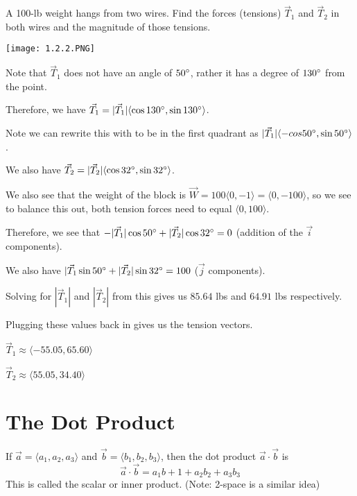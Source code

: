 \documentclass[../calc3.tex]{subfiles}
\begin{document}
\pagebreak
\begin{example}
    A 100-lb weight hangs from two wires. Find the forces (tensions) $\vec{T}_1$ and $\vec{T}_2$ in both wires and the magnitude of those tensions.
    \begin{center}
        \texttt{[image: 1.2.2.PNG]}
    \end{center}

    Note that $\vec{T}_1$ does not have an angle of $50\degree$, rather it has a degree of $130\degree$ from the point.

    Therefore, we have $\vec{T}_1=|\vec{T}_1|\langle \cos 130\degree, \sin 130\degree\rangle$.

    Note we can rewrite this with to be in the first quadrant as $|\vec{T}_1|\langle -cos 50\degree, \sin 50\degree\rangle$.

    We also have $\vec{T}_2=|\vec{T}_2|\langle \cos 32\degree, \sin 32\degree\rangle$.

    We also see that the weight of the block is $\vec{W}=100\langle 0,-1\rangle = \langle 0,-100\rangle$, so we see to balance this out, both tension forces need to equal $\langle 0,100\rangle$.

    Therefore, we see that $-|\vec{T}_1|\cos 50\degree + |\vec{T}_2|\cos 32\degree = 0$ (addition of the $\vec{i}$ components).

    We also have $|\vec{T}_1\sin 50\degree + |\vec{T}_2|\sin 32\degree = 100$ ($\vec{j}$ components).

    Solving for $|\vec{T}_1|$ and $|\vec{T}_2|$ from this gives us $85.64$ lbs and $64.91$ lbs respectively.

    Plugging these values back in gives us the tension vectors. 

    $\vec{T}_1 \approx \langle -55.05, 65.60\rangle$

    $\vec{T}_2 \approx \langle 55.05, 34.40 \rangle$
\end{example}

\section{The Dot Product}
\begin{definition}
    If $\vec{a}=\langle a_1,a_2,a_3\rangle$ and $\vec{b}=\langle b_1,b_2,b_3\rangle$, then the dot product $\vec{a}\cdot \vec{b}$ is 
    \[ \vec{a}\cdot \vec{b} = a_1b+1+a_2b_2+a_3b_3 \]
    This is called the scalar or inner product. (Note: 2-space is a similar idea)
\end{definition}
\end{document}
